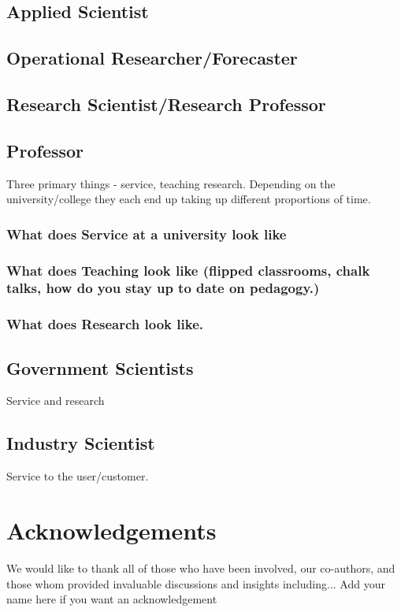 \documentclass[letterpaper, 12pt]{article}
\begin{document}
\subsection{Applied Scientist}

\subsection{Operational Researcher/Forecaster}

\subsection{Research Scientist/Research Professor}

\subsection{Professor }
Three primary things - service, teaching research. Depending on the university/college they each end up taking up different proportions of time. 

\subsubsection{What does Service at a university look like }

\subsubsection{What does Teaching look like (flipped classrooms, chalk talks, how do you stay up to date on pedagogy.)} 

\subsubsection{What does Research look like. }

\subsection{Government Scientists}
Service and research 

\subsection{Industry Scientist}
Service to the user/customer. 


\section{Acknowledgements}
We would like to thank all of those who have been involved, our co-authors, and those whom provided invaluable discussions and insights including... \textcolor{CASIIdarkred}{Add your name here if you want an acknowledgement}
\end{document}
